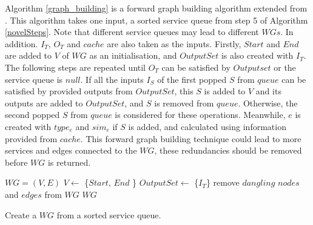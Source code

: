 \documentclass{llncs}
\begin{document}
\vspace{-0.5cm}
Algorithm  \ref{graph_building} is a forward graph building algorithm extended from \cite{blum1997fast}. This algorithm takes one input, a sorted service queue from step 5 of Algorithm \ref{novelSteps}. Note that different service queues may lead to different $WGs$. In addition. $I_{T}$, $O_{T}$ and $cache$ are also taken as the inputs. Firstly, $Start$ and $End$ are added to $V$ of $WG$ as an initialisation, and $OutputSet$ is also created with $I_{T}$. The following steps are repeated until $O_{T}$ can be satisfied by $Outputset$ or the service queue is $null$. If all the inputs $I_{S}$ of the first popped  $S$ from $queue$ can be satisfied by provided outputs from $OutputSet$, this $S$ is added to $V$ and its outputs are added to $OutputSet$, and $S$ is removed from $queue$. Otherwise, the second popped  $S$ from $queue$ is considered for these operations. Meanwhile, $e$ is created with $type_e$ and $sim_e$ if $S$ is added, and calculated using information provided from $cache$. This forward graph building technique could lead to more services and edges connected to the $WG$, these redundancies should be removed before $WG$ is returned.
\vspace{-0.5cm}

\begin{algorithm}
 \SetNlSty{}{}{:}
 $WG = (V, E)$\;
 $V \leftarrow$ \{$Start$, $End$ \} \;
 $OutputSet \leftarrow$ \{$I_{T}$\}\;
 remove $dangling$ $nodes$ and $edges$ from $WG$\; 
 \KwRet $WG$\;
 \caption{Create a $WG$ from a sorted service queue.}
\label{graph_building}
\end{algorithm} 

\vspace{-1.2cm}
\end{document}
